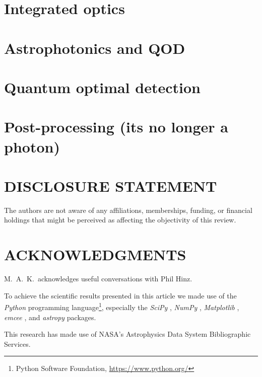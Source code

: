 \documentclass[letterpaper]{ar-1col}
\begin{document}
\section{Integrated optics}
\lipsum[2-4]

\section{Astrophotonics and QOD}
\lipsum[2-4]

\section{Quantum optimal detection}
\lipsum[2-4]

\section{Post-processing (its no longer a photon)}

\lipsum[2-4]

\section*{DISCLOSURE STATEMENT}
The authors are not aware of any affiliations, memberships, funding, or financial holdings that
might be perceived as affecting the objectivity of this review.

\section*{ACKNOWLEDGMENTS}
M.\ A.\ K.\ acknowledges useful conversations with
Phil Hinz.


To achieve the scientific results presented in this article we made use of the \emph{Python} programming language\footnote{Python Software Foundation, \url{https://www.python.org/}}, especially the \emph{SciPy} \citep{virtanen2020}, \emph{NumPy} \citep{numpy}, \emph{Matplotlib} \citep{Matplotlib}, \emph{emcee} \citep{foreman-mackey2013}, and \emph{astropy} \citep{astropy_1,astropy_2} packages.
%

This research has made use of NASA's Astrophysics Data System Bibliographic Services.





\end{document}
